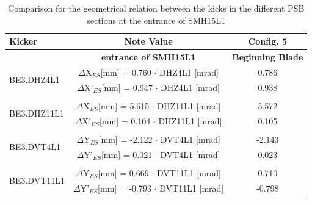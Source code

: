 \documentclass[11pt,letter,english]{article}
\begin{document}
\begin{table}[h]

  \caption{
    Comparison for the geometrical relation between the kicks in the different PSB sections at the entrance of SMH15L1
    }

  \label{tab:geom_rel}

  \begin{tabular}{ |l|c|c| }\hline
  Kicker & Note Value  & Config. 5 \\ \hline
         & {\bf entrance of SMH15L1} & {\bf Beginning Blade} \\ \hline
  \multirow{2}{*}{BE3.DHZ4L1} & $\Delta$X$_{ES}$[mm]  = 0.760 $\cdot$ DHZ4L1 [mrad] & 0.786 \\  \cline{2-3}
                              & $\Delta$X'$_{ES}$[mm] = 0.947 $\cdot$ DHZ4L1 [mrad] & 0.938 \\  \hline      
  \multicolumn{3}{|c|}{}        \\ \hline

  \multirow{2}{*}{BE3.DHZ11L1} & $\Delta$X$_{ES}$[mm]  = 5.615 $\cdot$ DHZ11L1 [mrad] & 5.572 \\ \cline{2-3} 
                               & $\Delta$X'$_{ES}$[mm] = 0.104 $\cdot$ DHZ11L1 [mrad] & 0.105 \\ \hline      
 \multicolumn{3}{|c|}{} \\ \hline

 \multirow{2}{*}{BE3.DVT4L1} & $\Delta$Y$_{ES}$[mm]  = -2.122 $\cdot$ DVT4L1 [mrad] & -2.143 \\  \cline{2-3}  
                             & $\Delta$Y'$_{ES}$[mm] =  0.021 $\cdot$ DVT4L1 [mrad] &  0.023 \\  \hline       
 \multicolumn{3}{|c|}{} \\ \hline

 \multirow{2}{*}{BE3.DVT11L1} & $\Delta$Y$_{ES}$[mm]  =  0.669 $\cdot$ DVT11L1 [mrad] &  0.710 \\ \cline{2-3}  
                              & $\Delta$Y'$_{ES}$[mm] = -0.793 $\cdot$ DVT11L1 [mrad] & -0.798 \\ \hline       
 \multicolumn{3}{|c|}{} \\ \hline

\end{tabular}
\end{table}
\end{document}
